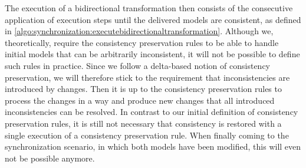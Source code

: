The execution of a bidirectional transformation then consists of the consecutive application of execution steps until the delivered models are consistent, as defined in \autoref{algo:synchronization:executebidirectionaltransformation}.
Although we, theoretically, require the consistency preservation rules to be able to handle initial models that can be arbitrarily inconsistent, it will not be possible to define such rules in practice.
Since we follow a delta-based notion of consistency preservation, we will therefore stick to the requirement that inconsistencies are introduced by changes.
Then it is up to the consistency preservation rules to process the changes in a way and produce new changes that all introduced inconsistencies can be resolved.
In contrast to our initial definition of consistency preservation rules, it is still not necessary that consistency is restored with a single execution of a consistency preservation rule.
When finally coming to the synchronization scenario, in which both models have been modified, this will even not be possible anymore.
